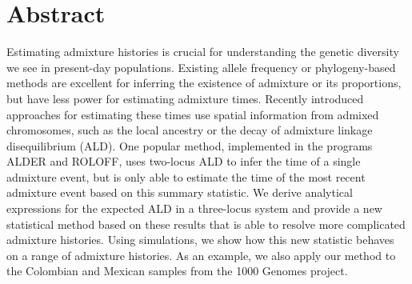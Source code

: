 \section*{Abstract}
Estimating admixture histories is crucial for understanding the genetic diversity we see in present-day populations. Existing allele frequency or phylogeny-based methods are excellent for inferring the existence of admixture or its proportions, but have less power for estimating admixture times. Recently introduced approaches for estimating these times use spatial information from admixed chromosomes, such as the local ancestry or the decay of admixture linkage disequilibrium (ALD).  One popular method, implemented in the programs ALDER and ROLOFF, uses two-locus ALD to infer the time of a single admixture event, but is only able to estimate the time of the most recent admixture event based on this summary statistic.  We derive analytical expressions for the expected ALD in a three-locus system and provide a new statistical method based on these results that is able to resolve more complicated admixture histories. Using simulations, we show how this new statistic behaves on a range of admixture histories. As an example, we also apply our method to the Colombian and Mexican samples from the 1000 Genomes project.

